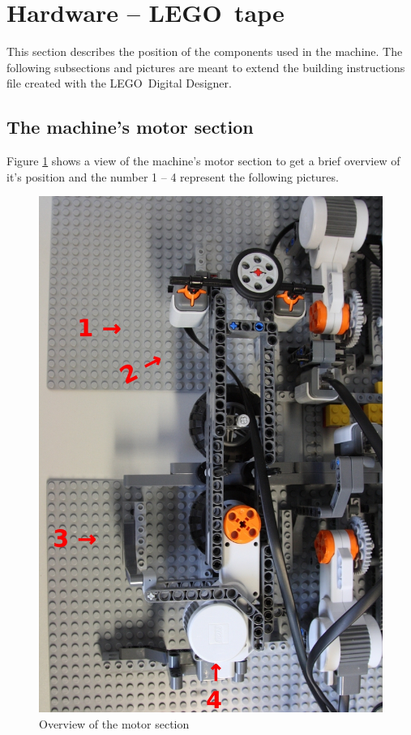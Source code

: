 \documentclass[%
  a4paper,%
  11pt,%
  blue,%
  hyperref	%
  ]{tubsartcl}
\begin{document}
\newpage

\section{Hardware -- LEGO\textregistered\, tape}

This section describes the position of the components used in the machine. The following subsections and pictures are meant to extend the building instructions file created with the LEGO\textregistered\, Digital Designer.

\subsection{The machine's motor section}

Figure \ref{pic:topview} shows a view of the machine's motor section to get a brief overview of it's position and the number 1 -- 4 represent the following pictures.

\begin{figure}[!htb]
\begin{center}
\includegraphics[scale=0.28]{graphics_lego/topview.jpg}
\end{center}
\caption{Overview of the motor section}
\label{pic:topview}
\end{figure}
\end{document}

